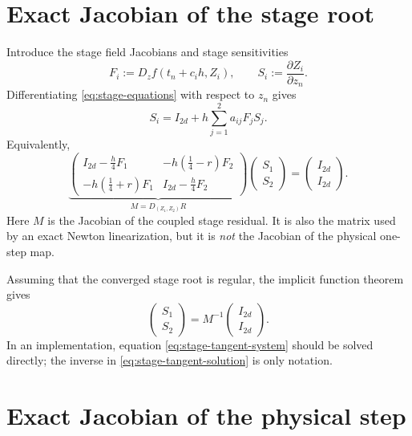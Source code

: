 \documentclass[11pt,a4paper]{article}
\newcommand{\Id}{I}
\begin{document}
\section{Exact Jacobian of the stage root}

Introduce the stage field Jacobians and stage sensitivities
\begin{equation}
 F_i:=D_zf(t_n+c_ih,Z_i),
 \qquad
 S_i:=\frac{\partial Z_i}{\partial z_n}.
 \label{eq:stage-derivatives}
\end{equation}
Differentiating \eqref{eq:stage-equations} with respect to $z_n$ gives
\begin{equation}
 S_i=\Id_{2d}+h\sum_{j=1}^2a_{ij}F_jS_j.
 \label{eq:stage-sensitivities}
\end{equation}
Equivalently,
\begin{equation}
 \underbrace{
 \begin{pmatrix}
  \Id_{2d}-\frac h4F_1
   &-h\left(\frac14-r\right)F_2\\[1mm]
  -h\left(\frac14+r\right)F_1
   &\Id_{2d}-\frac h4F_2
 \end{pmatrix}}_{M=D_{(Z_1,Z_2)}R}
 \begin{pmatrix}S_1\\S_2\end{pmatrix}
 =
 \begin{pmatrix}\Id_{2d}\\\Id_{2d}\end{pmatrix}.
 \label{eq:stage-tangent-system}
\end{equation}
Here $M$ is the Jacobian of the coupled stage residual.  It is also the matrix
used by an exact Newton linearization, but it is \emph{not} the Jacobian of the
physical one-step map.

Assuming that the converged stage root is regular, the implicit function
theorem gives
\begin{equation}
 \begin{pmatrix}S_1\\S_2\end{pmatrix}
 =M^{-1}
 \begin{pmatrix}\Id_{2d}\\\Id_{2d}\end{pmatrix}.
 \label{eq:stage-tangent-solution}
\end{equation}
In an implementation, equation \eqref{eq:stage-tangent-system} should be
solved directly; the inverse in \eqref{eq:stage-tangent-solution} is only
notation.

\section{Exact Jacobian of the physical step}
\end{document}
